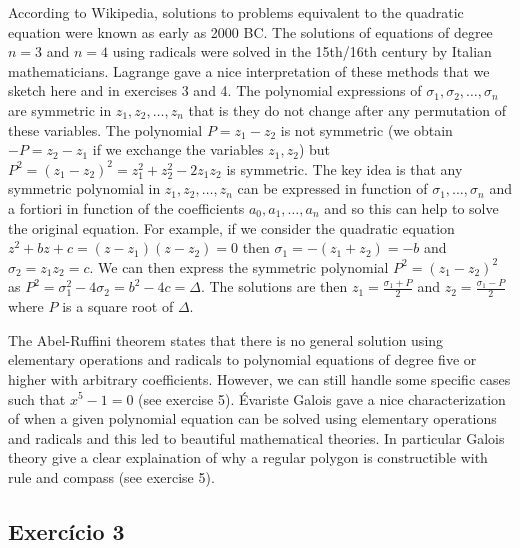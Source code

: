 According to Wikipedia, solutions to problems equivalent to the quadratic
equation were known as early as 2000 BC. The solutions of equations of degree
$n=3$ and $n=4$ using radicals were solved in the 15th/16th century by Italian
mathematicians.
Lagrange gave a nice interpretation of these methods that we sketch here
and in exercises 3 and 4. The polynomial expressions
of $\sigma_1, \sigma_2, \dots, \sigma_n$ are symmetric in $z_1, z_2, \dots, z_n$
that is they do not change after any permutation of these variables.
The polynomial $P = z_1 - z_2$ is not symmetric (we obtain $-P = z_2-z_1$ if we
exchange the variables $z_1,z_2$) but
$P^2 = {(z_1 - z_2)}^2 = z_1^2 + z_2^2 - 2z_1z_2$ is symmetric.
The key idea is that any symmetric polynomial in $z_1, z_2, \dots, z_n$ can be
expressed in function of $\sigma_1, \dots, \sigma_n$ and a fortiori in
function of the coefficients $a_0, a_1, \dots, a_n$ and so this can help
to solve the original equation. For example, if we consider the quadratic
equation $z^2 + bz + c = {(z-z_1)}{(z-z_2)} = 0$ then
$\sigma_1 = -{(z_1+z_2)} = -b$ and
$\sigma_2 = z_1z_2= c$. We can then express the symmetric polynomial
$P^2 = {(z_1-z_2)}^2$ as $P^2 = \sigma_1^2 - 4 \sigma_2 = b^2 - 4c = \Delta$.
The solutions are then
$z_1 = \frac{\sigma_1+P}{2}$ and $z_2 = \frac{\sigma_1-P}{2}$ where
$P$ is a square root of $\Delta$.

The Abel-Ruffini theorem states that there is no general solution
using elementary operations and radicals to polynomial equations of degree five
or higher with arbitrary coefficients. However, we can still handle some
specific cases such that $x^5 - 1 = 0$ (see exercise 5). Évariste Galois gave a
nice characterization of when a given polynomial equation can be solved
using elementary operations and radicals and this led to beautiful mathematical
theories. In particular Galois theory give a clear explaination of why a regular
polygon is constructible with rule and compass (see exercise 5).

\subsection*{Exercício 3}

